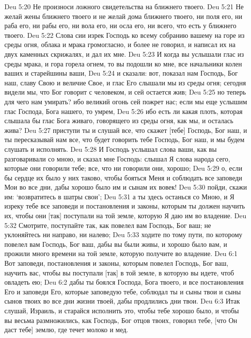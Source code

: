 Deu 5:20  Не произноси ложного свидетельства на ближнего твоего.
Deu 5:21  Не желай жены ближнего твоего и не желай дома ближнего твоего, ни поля его, ни раба его, ни рабы его, ни вола его, ни осла его, ни всего, что есть у ближнего твоего.
Deu 5:22  Слова сии изрек Господь ко всему собранию вашему на горе из среды огня, облака и мрака громогласно, и более не говорил, и написал их на двух каменных скрижалях, и дал их мне.
Deu 5:23  И когда вы услышали глас из среды мрака, и гора горела огнем, то вы подошли ко мне, все начальники колен ваших и старейшины ваши,
Deu 5:24  и сказали: вот, показал нам Господь, Бог наш, славу Свою и величие Свое, и глас Его слышали мы из среды огня; сегодня видели мы, что Бог говорит с человеком, и сей остается жив;
Deu 5:25  но теперь для чего нам умирать? ибо великий огонь сей пожрет нас; если мы еще услышим глас Господа, Бога нашего, то умрем,
Deu 5:26  ибо есть ли какая плоть, которая слышала бы глас Бога живаго, говорящего из среды огня, как мы, и осталась жива?
Deu 5:27  приступи ты и слушай все, что скажет [тебе] Господь, Бог наш, и ты пересказывай нам все, что будет говорить тебе Господь, Бог наш, и мы будем слушать и исполнять.
Deu 5:28  И Господь услышал слова ваши, как вы разговаривали со мною, и сказал мне Господь: слышал Я слова народа сего, которые они говорили тебе; все, что ни говорили они, хорошо;
Deu 5:29  о, если бы сердце их было у них таково, чтобы бояться Меня и соблюдать все заповеди Мои во все дни, дабы хорошо было им и сынам их вовек!
Deu 5:30  пойди, скажи им: `возвратитесь в шатры свои';
Deu 5:31  а ты здесь останься со Мною, и Я изреку тебе все заповеди и постановления и законы, которым ты должен научить их, чтобы они [так] поступали на той земле, которую Я даю им во владение.
Deu 5:32  Смотрите, поступайте так, как повелел вам Господь, Бог ваш; не уклоняйтесь ни направо, ни налево;
Deu 5:33  ходите по тому пути, по которому повелел вам Господь, Бог ваш, дабы вы были живы, и хорошо было вам, и прожили много времени на той земле, которую получите во владение.
Deu 6:1  Вот заповеди, постановления и законы, которым повелел Господь, Бог ваш, научить вас, чтобы вы поступали [так] в той земле, в которую вы идете, чтоб овладеть ею;
Deu 6:2  дабы ты боялся Господа, Бога твоего, и все постановления Его и заповеди Его, которые заповедую тебе, соблюдал ты и сыны твои и сыны сынов твоих во все дни жизни твоей, дабы продлились дни твои.
Deu 6:3  Итак слушай, Израиль, и старайся исполнить это, чтобы тебе хорошо было, и чтобы вы весьма размножились, как Господь, Бог отцов твоих, говорил тебе, [что Он даст тебе] землю, где течет молоко и мед.
